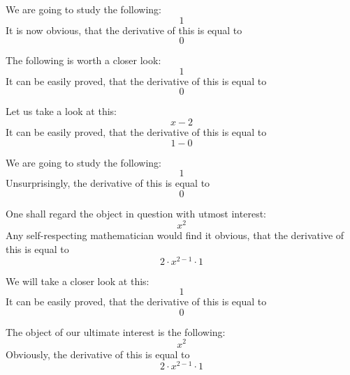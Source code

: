 \documentclass{article}
\begin{document}
We are going to study the following:
\begin{equation}
1 
\end{equation}
It is now obvious, that the derivative of this is equal to
\begin{equation}
0 
\end{equation}

The following is worth a closer look:
\begin{equation}
1 
\end{equation}
It can be easily proved, that the derivative of this is equal to
\begin{equation}
0 
\end{equation}

Let us take a look at this:
\begin{equation}
x - 2 
\end{equation}
It can be easily proved, that the derivative of this is equal to
\begin{equation}
1 - 0 
\end{equation}

We are going to study the following:
\begin{equation}
1 
\end{equation}
Unsurprisingly, the derivative of this is equal to
\begin{equation}
0 
\end{equation}

One shall regard the object in question with utmost interest:
\begin{equation}
x ^{2 } 
\end{equation}
Any self-respecting mathematician would find it obvious, that the derivative of this is equal to
\begin{equation}
2 \cdot x ^{2 - 1 } \cdot 1 
\end{equation}

We will take a closer look at this:
\begin{equation}
1 
\end{equation}
It can be easily proved, that the derivative of this is equal to
\begin{equation}
0 
\end{equation}

The object of our ultimate interest is the following:
\begin{equation}
x ^{2 } 
\end{equation}
Obviously, the derivative of this is equal to
\begin{equation}
2 \cdot x ^{2 - 1 } \cdot 1 
\end{equation}
\end{document}
